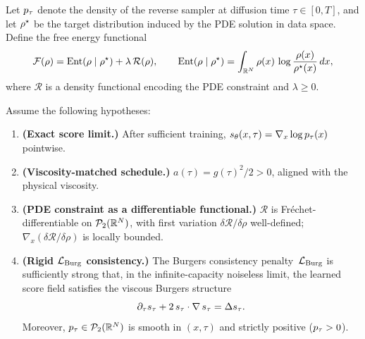 \begin{theorem}
\label{appx-thm:jko}
Let $p_{\tau}$ denote the density of the reverse sampler at diffusion time
$\tau \in [0,T]$, and let $\rho^{\star}$ be the target distribution induced by the PDE
solution in data space.
Define the free energy functional
\begin{equation}
\mathcal{F}(\rho) = \mathrm{Ent}(\rho \mid \rho^{\star}) + \lambda\,\mathcal{R}(\rho),
\qquad
\mathrm{Ent}(\rho \mid \rho^{\star}) = \int_{\mathbb{R}^{N}} \rho(x)\,\log\frac{\rho(x)}{\rho^{\star}(x)}\,dx,
\end{equation}
where $\mathcal{R}$ is a density functional encoding the PDE constraint and $\lambda \ge 0$.

Assume the following hypotheses:
\begin{enumerate}
\item \textbf{(Exact score limit.)}
  After sufficient training, $s_{\theta}(x,\tau) = \nabla_x \log p_{\tau}(x)$ pointwise.

\item \textbf{(Viscosity-matched schedule.)}
  $a(\tau) = g(\tau)^{2}/2 > 0$, aligned with the physical viscosity.

\item \textbf{(PDE constraint as a differentiable functional.)}
  $\mathcal{R}$ is Fr\'{e}chet-differentiable on $\mathcal{P}_{2}(\mathbb{R}^{N})$, with
  first variation $\delta \mathcal{R} / \delta \rho$ well-defined;
  $\nabla_x (\delta \mathcal{R} / \delta \rho)$ is locally bounded.

\item \textbf{(Rigid $\mathcal{L}_{\mathrm{Burg}}$ consistency.)}
  The Burgers consistency penalty~$\mathcal{L}_{\mathrm{Burg}}$ is sufficiently strong that, in the
  infinite-capacity noiseless limit, the learned score field satisfies the viscous
  Burgers structure
  \begin{equation}
  \partial_{\tau} s_{\tau} + 2\,s_{\tau}\cdot\nabla\,s_{\tau}
    = \Delta s_{\tau}.
  \end{equation}
  Moreover, $p_{\tau} \in \mathcal{P}_{2}(\mathbb{R}^{N})$ is smooth in $(x,\tau)$ and strictly
  positive ($p_{\tau} > 0$).


\end{enumerate}
\end{theorem}
